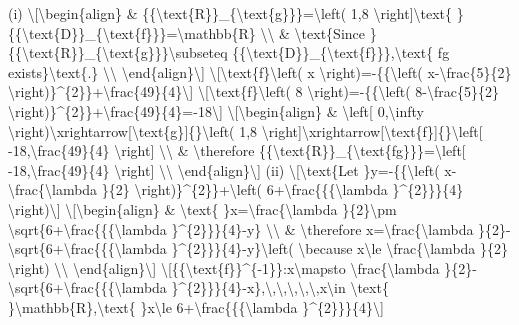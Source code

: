 \item (i) \textbackslash{[}\textbackslash begin\{align\} \& \{\{\textbackslash text\{R\}\}\_\{\textbackslash text\{g\}\}\}=\textbackslash left(
1,8 \textbackslash right{]}\textbackslash text\{ \}\{\{\textbackslash text\{D\}\}\_\{\textbackslash text\{f\}\}\}=\textbackslash mathbb\{R\}
\textbackslash\textbackslash{} \& \textbackslash text\{Since \}\{\{\textbackslash text\{R\}\}\_\{\textbackslash text\{g\}\}\}\textbackslash subseteq
\{\{\textbackslash text\{D\}\}\_\{\textbackslash text\{f\}\}\},\textbackslash text\{
fg exists\}\textbackslash text\{.\} \textbackslash\textbackslash{}
\textbackslash end\{align\}\textbackslash{]} \textbackslash{[}\textbackslash text\{f\}\textbackslash left(
x \textbackslash right)=-\{\{\textbackslash left( x-\textbackslash frac\{5\}\{2\}
\textbackslash right)\}\textasciicircum\{2\}\}+\textbackslash frac\{49\}\{4\}\textbackslash{]}
\textbackslash{[}\textbackslash text\{f\}\textbackslash left(
8 \textbackslash right)=-\{\{\textbackslash left( 8-\textbackslash frac\{5\}\{2\}
\textbackslash right)\}\textasciicircum\{2\}\}+\textbackslash frac\{49\}\{4\}=-18\textbackslash{]}
\textbackslash{[}\textbackslash begin\{align\} \& \textbackslash left{[}
0,\textbackslash infty \textbackslash right)\textbackslash xrightarrow{[}\textbackslash text\{g\}{]}\{\}\textbackslash left(
1,8 \textbackslash right{]}\textbackslash xrightarrow{[}\textbackslash text\{f\}{]}\{\}\textbackslash left{[}
-18,\textbackslash frac\{49\}\{4\} \textbackslash right{]} \textbackslash\textbackslash{}
\& \textbackslash therefore \{\{\textbackslash text\{R\}\}\_\{\textbackslash text\{fg\}\}\}=\textbackslash left{[}
-18,\textbackslash frac\{49\}\{4\} \textbackslash right{]} \textbackslash\textbackslash{}
\textbackslash end\{align\}\textbackslash{]} (ii) \textbackslash{[}\textbackslash text\{Let
\}y=-\{\{\textbackslash left( x-\textbackslash frac\{\textbackslash lambda
\}\{2\} \textbackslash right)\}\textasciicircum\{2\}\}+\textbackslash left(
6+\textbackslash frac\{\{\{\textbackslash lambda \}\textasciicircum\{2\}\}\}\{4\}
\textbackslash right)\textbackslash{]} \textbackslash{[}\textbackslash begin\{align\}
\& \textbackslash text\{ \}x=\textbackslash frac\{\textbackslash lambda
\}\{2\}\textbackslash pm \textbackslash sqrt\{6+\textbackslash frac\{\{\{\textbackslash lambda
\}\textasciicircum\{2\}\}\}\{4\}-y\} \textbackslash\textbackslash{}
\& \textbackslash therefore x=\textbackslash frac\{\textbackslash lambda
\}\{2\}-\textbackslash sqrt\{6+\textbackslash frac\{\{\{\textbackslash lambda
\}\textasciicircum\{2\}\}\}\{4\}-y\}\textbackslash left( \textbackslash because
x\textbackslash le \textbackslash frac\{\textbackslash lambda \}\{2\}
\textbackslash right) \textbackslash\textbackslash{} \textbackslash end\{align\}\textbackslash{]}
\textbackslash{[}\{\{\textbackslash text\{f\}\}\textasciicircum\{-1\}\}:x\textbackslash mapsto
\textbackslash frac\{\textbackslash lambda \}\{2\}-\textbackslash sqrt\{6+\textbackslash frac\{\{\{\textbackslash lambda
\}\textasciicircum\{2\}\}\}\{4\}-x\},\textbackslash ,\textbackslash ,\textbackslash ,\textbackslash ,\textbackslash ,x\textbackslash in
\textbackslash text\{ \}\textbackslash mathbb\{R\},\textbackslash text\{
\}x\textbackslash le 6+\textbackslash frac\{\{\{\textbackslash lambda
\}\textasciicircum\{2\}\}\}\{4\}\textbackslash{]}